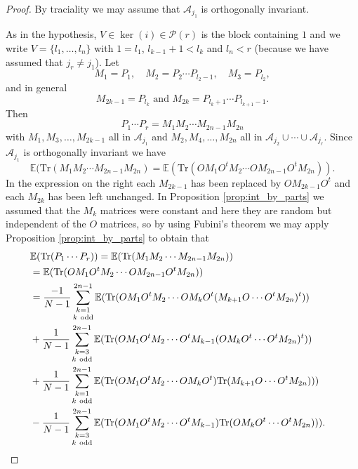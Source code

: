 \documentclass[10pt,a4paper]{amsart}
\newcommand{\Tr}{\mathrm{Tr}}
\newcommand{\cA}{\mathcal{A}}
\newcommand{\cP}{\mathcal{P}}
\newcommand{\rE} {\mathbb{E}}
\begin{document}
\begin{proof} 
By traciality we may assume that $\cA_{j_1}$ is orthogonally invariant. 


As in the hypothesis, $ V \in \ker(i) \in \cP(r)$ is the
block containing $1$ and we write $V = \{ l_1, \dots, l_n\}$
with $1 = l_1$, $l_{k-1} + 1 < l_k$ and $l_n < r$ (because
we have assumed that $j_r \not = j_1$). Let
\[
M_1 = P_1, \quad M_2 = P_2 \cdots P_{l_2 -1},\quad M_3 = P_{l_2},\]
and in general 
\[
M_{2k-1} = P_{l_k} \mbox{\ and\ } M_{2k} = P_{l_k + 1} \cdots P_{l_{k+1} - 1}. 
\]
Then 
\[
P_1 \cdots P_r = M_1 M_2 \cdots M_{2n-1} M_{2n}
\]
with $M_1, M_3, \dots, M_{2k-1}$ all in $\cA_{j_1}$ and
$M_2, M_4, \dots, M_{2n}$ all in $\cA_{j_2} \cup \cdots \cup
\cA_{j_r}$. Since $\cA_{j_1}$ is orthogonally invariant we
have
\[
\rE(\Tr(M_1 M_2 \cdots M_{2n-1} M_{2n}) 
=
\rE(\Tr(OM_1 O^t M_2 \cdots O M_{2n-1} O^t M_{2n})).
\]
In the expression on the right each $M_{2k-1}$ has been
replaced by $OM_{2k-1}O^t$ and each $M_{2k}$ has been left
unchanged. In Proposition \ref{prop:int_by_parts} we assumed
that the $M_k$ matrices were constant and here they are
random but independent of the $O$ matrices, so by using
Fubini's theorem we may apply Proposition
\ref{prop:int_by_parts} to obtain that
\begin{align}\lefteqn{
\rE(\Tr(P_1 \cdots P_r)) = \rE(\Tr(M_1 M_2 \cdots M_{2n - 1} M_{2 n}))} \notag \\
&\mbox{} =
\rE(\Tr(OM_1O^t M_2 \cdots OM_{2n - 1}O^t M_{2 n})) \notag \\
& \mbox{} =
\label{eq:first case}
\frac{-1}{N - 1} \mathop{\sum_{k=1}^{2n - 1}}_{k \mathrm{\ odd}}
\rE( \Tr(O M_1 O^t M_2 \cdots O M_kO^t (M_{k + 1} O \cdots O^t M_{2n})^t )) \\
& \mbox{} +
\label{eq:second case}
\frac{1}{N - 1} \mathop{\sum_{k=3}^{2n - 1}}_{k \mathrm{\ odd}}
\rE( \Tr(O M_1 O^t M_2 \cdots O^t M_{k-1} (O M_{k} O^t \cdots O^t M_{2n})^t )) \\
& \mbox{} +
\label{eq:third case}
\frac{1}{N - 1} \mathop{\sum_{k=1}^{2n - 1}}_{k \mathrm{\ odd}}
\rE( \Tr(O M_1 O^t M_2 \cdots O M_{k}O^t) \Tr(M_{k+1} O \cdots O^t M_{2n}) )) \\
& \mbox{} -
\label{eq:fourth case}
\frac{1}{N - 1} \mathop{\sum_{k=3}^{2n - 1}}_{k \mathrm{\ odd}}
\rE( \Tr(O M_1 O^t M_2 \cdots O^t M_{k-1}) \Tr(OM_{k} O^t \cdots O^t M_{2n}) )).
\end{align}


\end{proof}
\end{document}
